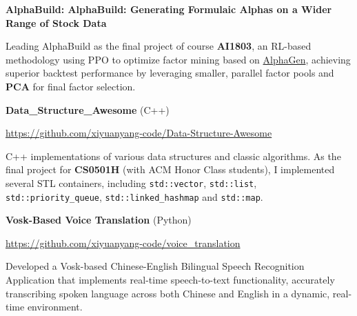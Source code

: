 \documentclass[letterpaper,11pt]{article}
\begin{document}
\textbf{AlphaBuild: AlphaBuild: Generating Formulaic Alphas on a Wider Range of Stock Data}

Leading AlphaBuild as the final project of course \textbf{AI1803}, an RL-based methodology using PPO to optimize factor mining based on \href{https://github.com/RL-MLDM/alphagen}{AlphaGen}, achieving superior backtest performance by leveraging smaller, parallel factor pools and \textbf{PCA} for final factor selection.
\newline

{\bfseries\selectfont Data\_Structure\_Awesome} (C++)

\url{https://github.com/xiyuanyang-code/Data-Structure-Awesome}

C++ implementations of various data structures and classic algorithms. As the final project for \textbf{CS0501H} (with ACM Honor Class students), I implemented several STL containers, including \texttt{std::vector}, \texttt{std::list}, \texttt{std::priority\_queue}, \texttt{std::linked\_hashmap} and \texttt{std::map}.
\newline








\textbf{Vosk-Based Voice Translation} (Python)

\url{https://github.com/xiyuanyang-code/voice_translation}

Developed a Vosk-based Chinese-English Bilingual Speech Recognition Application that implements real-time speech-to-text functionality, accurately transcribing spoken language across both Chinese and English in a dynamic, real-time environment.
\newline
\end{document}
